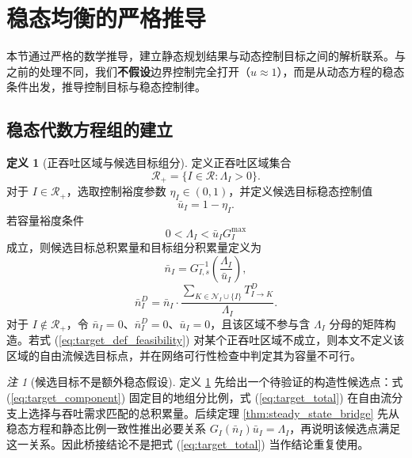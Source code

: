 \documentclass[a4paper,12pt]{article}
\theoremstyle{plain}
\theoremstyle{definition}
\newtheorem{definition}[theorem]{定义}
\theoremstyle{remark}
\newtheorem{remark}[theorem]{注}
\begin{document}
\section{稳态均衡的严格推导}

本节通过严格的数学推导，建立静态规划结果与动态控制目标之间的解析联系。与之前的处理不同，我们\textbf{不假设}边界控制完全打开（$u\approx 1$），而是从动态方程的稳态条件出发，推导控制目标与稳态控制律。

\subsection{稳态代数方程组的建立}

\begin{definition}[正吞吐区域与候选目标组分]\label{def:target_component}
定义正吞吐区域集合
\begin{equation}\label{eq:positive_regions}
    \mathcal R_+ = \{I\in\mathcal R:\Lambda_I>0\}.
\end{equation}
对于 $I\in\mathcal R_+$，选取控制裕度参数 $\eta_I\in(0,1)$，并定义候选目标稳态控制值
\begin{equation}\label{eq:target_control_margin}
    \bar u_I=1-\eta_I .
\end{equation}
若容量裕度条件
\begin{equation}\label{eq:target_def_feasibility}
    0<\Lambda_I<\bar u_I G_I^{\max}
\end{equation}
成立，则候选目标总积累量和目标组分积累量定义为
\begin{equation}\label{eq:target_total}
    \bar{n}_I = G_{I,s}^{-1}\left(\frac{\Lambda_I}{\bar u_I}\right),
\end{equation}
\begin{equation} \label{eq:target_component}
    \bar{n}_I^D = \bar{n}_I \cdot \frac{\sum_{K \in \mathcal{N}_I \cup \{I\}} T_{I \to K}^D}{\Lambda_I}.
\end{equation}
对于 $I\notin\mathcal R_+$，令 $\bar n_I=0$、$\bar n_I^D=0$、$\bar u_I=0$，且该区域不参与含 $\Lambda_I$ 分母的矩阵构造。若式 (\ref{eq:target_def_feasibility}) 对某个正吞吐区域不成立，则本文不定义该区域的自由流候选目标点，并在网络可行性检查中判定其为容量不可行。
\end{definition}

\begin{remark}[候选目标不是额外稳态假设]\label{rem:target_not_assumption}
定义 \ref{def:target_component} 先给出一个待验证的构造性候选点：式 (\ref{eq:target_component}) 固定目的地组分比例，式 (\ref{eq:target_total}) 在自由流分支上选择与吞吐需求匹配的总积累量。后续定理 \ref{thm:steady_state_bridge} 先从稳态方程和静态比例一致性推出必要关系 $G_I(\bar n_I)\bar u_I=\Lambda_I$，再说明该候选点满足这一关系。因此桥接结论不是把式 (\ref{eq:target_total}) 当作结论重复使用。
\end{remark}
\end{document}
